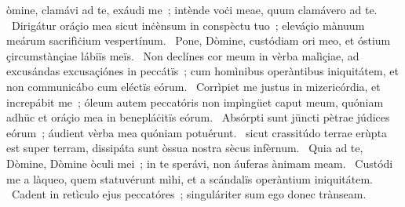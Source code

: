 \psalmChapterWithInscription{}
{ }
{%
òmine, clamávi ad te, exáudi me~; intènde voċi meae, quum clamávero ad te. 
~Dirigátur oráçio mea sicut inċènsum in conspèctu tuo~; eleváçio mànuum meárum sacrifìċium vespertínum. 
~Pone, Dòmine, custódiam ori meo, et óstium çircumstànçiae lábiïs meïs. 
~Non declínes cor meum in vèrba malìçiae, ad excusándas excusaçiónes in peccátïs~; cum homìnibus operàntibus iniquitátem, et non communicábo cum eléctïs eórum. 
~Corrìpiet me justus in mizericórdia, et increpábit me~; óleum autem peccatóris non impìngüet caput meum, quóniam adhüc et oráçio mea in benepláċitïs eórum. 
~Absórpti sunt jüncti pètrae júdices eórum~; áudient vèrba mea quóniam potuérunt. 
~sicut crassitúdo terrae erùpta est super terram, dissipáta sunt òssua nostra sècus infèrnum. 
~Quia ad te, Dòmine, Dòmine òculi mei~; in te sperávi, non áuferas ànimam meam. 
~Custódi me a làqueo, quem statuvérunt mìhi, et a scándalïs operàntium iniquitátem. 
~Cadent in retìculo ejus peccatóres~; singuláriter sum ego donec trànseam. 
}
